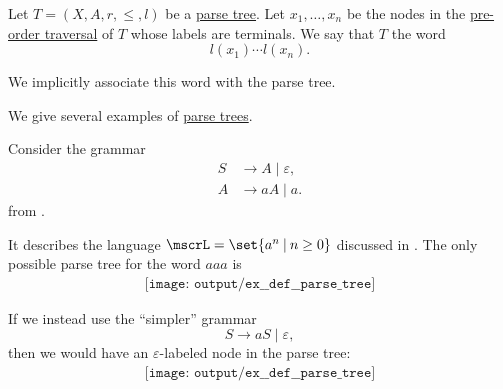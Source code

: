 \begin{definition}\label{def:parse_tree_word}
  Let \( T = (X, A, r, \leq, l) \) be a \hyperref[def:parse_tree]{parse tree}. Let \( x_1, \ldots, x_n \) be the nodes in the \hyperref[def:traversal_ordering]{pre-order traversal} of \( T \) whose labels are terminals. We say that \( T \)  the word
  \begin{equation*}
    l(x_1) \cdots l(x_n).
  \end{equation*}

  We implicitly associate this word with the parse tree.
\end{definition}

\begin{example}\label{ex:def:parse_tree}
  We give several examples of \hyperref[def:parse_tree]{parse trees}.

  \begin{thmenum}
     Consider the grammar
    \begin{equation*}
      \begin{aligned}
        S &\to A \mid \varepsilon, \\
        A &\to aA \mid a.
      \end{aligned}
    \end{equation*}
    from .

    It describes the language \( \mscrL = \set{ a^n \given n \geq 0 } \) discussed in . The only possible parse tree for the word \( aaa \) is
    \begin{equation*}\label{eq:ex:def:parse_tree/an}
      \begin{aligned}
        \texttt{[image: output/ex\_\_def\_\_parse\_tree]}
      \end{aligned}
    \end{equation*}

    If we instead use the \enquote{simpler} grammar
    \begin{equation*}
      S \to aS \mid \varepsilon,
    \end{equation*}
    then we would have an \( \varepsilon \)-labeled node in the parse tree:
    \begin{equation*}
      \begin{aligned}
        \texttt{[image: output/ex\_\_def\_\_parse\_tree]}
      \end{aligned}
    \end{equation*}


\end{thmenum}
\end{example}
